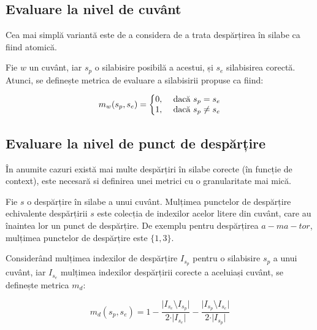 \subsection{Evaluare la nivel de cuvânt}


Cea mai simplă variantă este de a considera de a trata despărțirea în silabe ca fiind atomică.

\begin{defi} Fie $w$ un cuvânt, iar $s_p$ o silabisire posibilă a acestui, și $s_e$ silabisirea corectă. Atunci, se definește metrica de evaluare a silabisirii propuse ca fiind:

\begin{equation}
m_w(s_p,s_e) = \left\{
\begin{matrix}
0, 	& $ dacă $ s_p=s_e\\ 
1,	& $ dacă $ s_p\neq s_e \\
\end{matrix}
\right. 
\end{equation}
\end{defi}

\subsection{Evaluare la nivel de punct de despărțire}

În anumite cazuri există mai multe despărțiri în silabe corecte (în funcție de context), este necesară si definirea unei metrici cu o granularitate mai mică.

\begin{defi}
Fie $s$ o despărțire în silabe a unui cuvânt. Mulțimea punctelor de despărțire echivalente despărțirii $s$ este colecția de indexilor acelor litere din cuvânt, care au înaintea lor un punct de despărțire. De exemplu pentru despărțirea $a-ma-tor$, mulțimea punctelor de despărțire este $\{1,3\}$.
\end{defi}


\begin{defi}
Considerând mulțimea indexilor de despărțire $I_{s_p}$ pentru o silabisire $s_p$ a unui cuvânt, iar $I_{s_e}$ mulțimea indexilor despărțirii corecte a aceluiași cuvânt, se definește metrica $m_d$:

\begin{equation}
m_d(s_p,s_e) = 1- \frac{\vert I_{s_e} \setminus I_{s_p} \vert}{2 \cdot \vert I_{s_e} \vert} - \frac{\vert I_{s_p} \setminus I_{s_e} \vert}{2 \cdot \vert I_{s_p} \vert}
\end{equation}
\end{defi}

